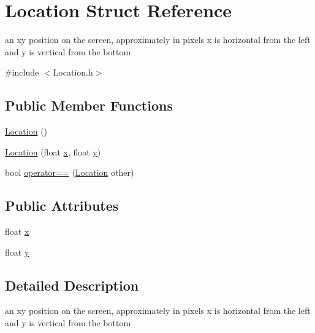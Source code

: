 \hypertarget{structLocation}{\section{Location Struct Reference}
\label{structLocation}
}


an xy position on the screen, approximately in pixels x is horizontal from the left and y is vertical from the bottom  




{\ttfamily \#include $<$Location.\-h$>$}

\subsection*{Public Member Functions}
\begin{DoxyCompactItemize}
\item 
\hyperlink{structLocation_a87790c14997fd8cdd12080c78c9794bb}{Location} ()
\item 
\hyperlink{structLocation_aa2fa660a7d06ac9860f22901e10377ba}{Location} (float \hyperlink{structLocation_ac81cc1119b7ac8ac70ee635f2e3d4bb7}{x}, float \hyperlink{structLocation_a10fbad67977d8dd3911eb629c1797684}{y})
\item 
bool \hyperlink{structLocation_a6df5338095c13ad58c59fe34fab6ef7a}{operator==} (\hyperlink{structLocation}{Location} other)
\end{DoxyCompactItemize}
\subsection*{Public Attributes}
\begin{DoxyCompactItemize}
\item 
float \hyperlink{structLocation_ac81cc1119b7ac8ac70ee635f2e3d4bb7}{x}
\item 
float \hyperlink{structLocation_a10fbad67977d8dd3911eb629c1797684}{y}
\end{DoxyCompactItemize}


\subsection{Detailed Description}
an xy position on the screen, approximately in pixels x is horizontal from the left and y is vertical from the bottom 



